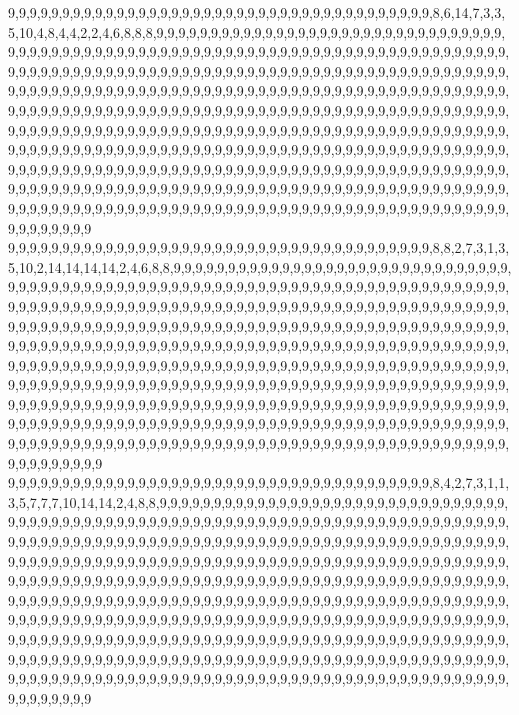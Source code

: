 9,9,9,9,9,9,9,9,9,9,9,9,9,9,9,9,9,9,9,9,9,9,9,9,9,9,9,9,9,9,9,9,9,9,9,9,9,9,9,8,6,14,7,3,3,5,10,4,8,4,4,2,2,4,6,8,8,8,9,9,9,9,9,9,9,9,9,9,9,9,9,9,9,9,9,9,9,9,9,9,9,9,9,9,9,9,9,9,9,9,9,9,9,9,9,9,9,9,9,9,9,9,9,9,9,9,9,9,9,9,9,9,9,9,9,9,9,9,9,9,9,9,9,9,9,9,9,9,9,9,9,9,9,9,9,9,9,9,9,9,9,9,9,9,9,9,9,9,9,9,9,9,9,9,9,9,9,9,9,9,9,9,9,9,9,9,9,9,9,9,9,9,9,9,9,9,9,9,9,9,9,9,9,9,9,9,9,9,9,9,9,9,9,9,9,9,9,9,9,9,9,9,9,9,9,9,9,9,9,9,9,9,9,9,9,9,9,9,9,9,9,9,9,9,9,9,9,9,9,9,9,9,9,9,9,9,9,9,9,9,9,9,9,9,9,9,9,9,9,9,9,9,9,9,9,9,9,9,9,9,9,9,9,9,9,9,9,9,9,9,9,9,9,9,9,9,9,9,9,9,9,9,9,9,9,9,9,9,9,9,9,9,9,9,9,9,9,9,9,9,9,9,9,9,9,9,9,9,9,9,9,9,9,9,9,9,9,9,9,9,9,9,9,9,9,9,9,9,9,9,9,9,9,9,9,9,9,9,9,9,9,9,9,9,9,9,9,9,9,9,9,9,9,9,9,9,9,9,9,9,9,9,9,9,9,9,9,9,9,9,9,9,9,9,9,9,9,9,9,9,9,9,9,9,9,9,9,9,9,9,9,9,9,9,9,9,9,9,9,9,9,9,9,9,9,9,9,9,9,9,9,9,9,9,9,9,9,9,9,9,9,9,9,9,9,9,9,9,9,9,9,9,9,9,9,9,9,9,9,9,9,9,9,9,9,9,9,9,9,9,9,9,9,9,9,9,9,9,9,9,9,9,9,9,9,9,9,9,9,9,9,9,9,9,9,9,9,9,9,9,9,9,9,9,9,9,9,9,9,9,9,9,9,9,9,9,9,9,9,9,9,9,9,9,9,9,9,9,9,9,9,9
9,9,9,9,9,9,9,9,9,9,9,9,9,9,9,9,9,9,9,9,9,9,9,9,9,9,9,9,9,9,9,9,9,9,9,9,9,9,9,8,8,2,7,3,1,3,5,10,2,14,14,14,14,2,4,6,8,8,9,9,9,9,9,9,9,9,9,9,9,9,9,9,9,9,9,9,9,9,9,9,9,9,9,9,9,9,9,9,9,9,9,9,9,9,9,9,9,9,9,9,9,9,9,9,9,9,9,9,9,9,9,9,9,9,9,9,9,9,9,9,9,9,9,9,9,9,9,9,9,9,9,9,9,9,9,9,9,9,9,9,9,9,9,9,9,9,9,9,9,9,9,9,9,9,9,9,9,9,9,9,9,9,9,9,9,9,9,9,9,9,9,9,9,9,9,9,9,9,9,9,9,9,9,9,9,9,9,9,9,9,9,9,9,9,9,9,9,9,9,9,9,9,9,9,9,9,9,9,9,9,9,9,9,9,9,9,9,9,9,9,9,9,9,9,9,9,9,9,9,9,9,9,9,9,9,9,9,9,9,9,9,9,9,9,9,9,9,9,9,9,9,9,9,9,9,9,9,9,9,9,9,9,9,9,9,9,9,9,9,9,9,9,9,9,9,9,9,9,9,9,9,9,9,9,9,9,9,9,9,9,9,9,9,9,9,9,9,9,9,9,9,9,9,9,9,9,9,9,9,9,9,9,9,9,9,9,9,9,9,9,9,9,9,9,9,9,9,9,9,9,9,9,9,9,9,9,9,9,9,9,9,9,9,9,9,9,9,9,9,9,9,9,9,9,9,9,9,9,9,9,9,9,9,9,9,9,9,9,9,9,9,9,9,9,9,9,9,9,9,9,9,9,9,9,9,9,9,9,9,9,9,9,9,9,9,9,9,9,9,9,9,9,9,9,9,9,9,9,9,9,9,9,9,9,9,9,9,9,9,9,9,9,9,9,9,9,9,9,9,9,9,9,9,9,9,9,9,9,9,9,9,9,9,9,9,9,9,9,9,9,9,9,9,9,9,9,9,9,9,9,9,9,9,9,9,9,9,9,9,9,9,9,9,9,9,9,9,9,9,9,9,9,9,9,9,9,9,9,9,9,9,9,9,9,9,9,9,9,9,9,9,9,9,9,9,9,9,9,9,9,9,9
9,9,9,9,9,9,9,9,9,9,9,9,9,9,9,9,9,9,9,9,9,9,9,9,9,9,9,9,9,9,9,9,9,9,9,9,9,9,9,8,4,2,7,3,1,1,3,5,7,7,7,10,14,14,2,4,8,8,9,9,9,9,9,9,9,9,9,9,9,9,9,9,9,9,9,9,9,9,9,9,9,9,9,9,9,9,9,9,9,9,9,9,9,9,9,9,9,9,9,9,9,9,9,9,9,9,9,9,9,9,9,9,9,9,9,9,9,9,9,9,9,9,9,9,9,9,9,9,9,9,9,9,9,9,9,9,9,9,9,9,9,9,9,9,9,9,9,9,9,9,9,9,9,9,9,9,9,9,9,9,9,9,9,9,9,9,9,9,9,9,9,9,9,9,9,9,9,9,9,9,9,9,9,9,9,9,9,9,9,9,9,9,9,9,9,9,9,9,9,9,9,9,9,9,9,9,9,9,9,9,9,9,9,9,9,9,9,9,9,9,9,9,9,9,9,9,9,9,9,9,9,9,9,9,9,9,9,9,9,9,9,9,9,9,9,9,9,9,9,9,9,9,9,9,9,9,9,9,9,9,9,9,9,9,9,9,9,9,9,9,9,9,9,9,9,9,9,9,9,9,9,9,9,9,9,9,9,9,9,9,9,9,9,9,9,9,9,9,9,9,9,9,9,9,9,9,9,9,9,9,9,9,9,9,9,9,9,9,9,9,9,9,9,9,9,9,9,9,9,9,9,9,9,9,9,9,9,9,9,9,9,9,9,9,9,9,9,9,9,9,9,9,9,9,9,9,9,9,9,9,9,9,9,9,9,9,9,9,9,9,9,9,9,9,9,9,9,9,9,9,9,9,9,9,9,9,9,9,9,9,9,9,9,9,9,9,9,9,9,9,9,9,9,9,9,9,9,9,9,9,9,9,9,9,9,9,9,9,9,9,9,9,9,9,9,9,9,9,9,9,9,9,9,9,9,9,9,9,9,9,9,9,9,9,9,9,9,9,9,9,9,9,9,9,9,9,9,9,9,9,9,9,9,9,9,9,9,9,9,9,9,9,9,9,9,9,9,9,9,9,9,9,9,9,9,9,9,9,9,9,9,9,9,9,9,9,9,9,9,9,9,9,9,9,9,9,9,9,9,9,9,9
